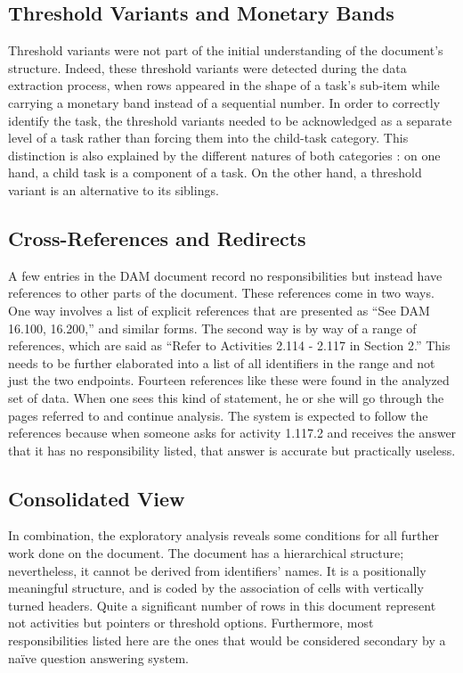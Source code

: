 \subsection{Threshold Variants and Monetary Bands}

Threshold variants were not part of the initial understanding of the document’s structure. Indeed, these threshold variants were detected during the data extraction process, when rows appeared in the shape of a task’s sub-item while carrying a monetary band instead of a sequential number. 
In order to correctly identify the task, the threshold variants needed to be acknowledged as a separate level of a task rather than forcing them into the child-task category. This distinction is also explained by the different natures of both categories : on one hand, a child task is a component of a task. On the other hand, a threshold variant is an alternative to its siblings. 

\subsection{Cross-References and Redirects}

A few entries in the DAM document record no responsibilities but instead have references to other parts of the document. These references come in two ways. One way involves a list of explicit references that are presented as “See DAM 16.100, 16.200,” and similar forms. The second way is by way of a range of references, which are said as “Refer to Activities 2.114 - 2.117 in Section 2.” This needs to be further elaborated into a list of all identifiers in the range and not just the two endpoints.
Fourteen references like these were found in the analyzed set of data. When one sees this kind of statement, he or she will go through the pages referred to and continue analysis. The system is expected to follow the references because when someone asks for activity 1.117.2 and receives the answer that it has no responsibility listed, that answer is accurate but practically useless.

\subsection{Consolidated View}

In combination, the exploratory analysis reveals some conditions for all further work done on the document. The document has a hierarchical structure; nevertheless, it cannot be derived from identifiers’ names. It is a positionally meaningful structure, and is coded by the association of cells with vertically turned headers. Quite a significant number of rows in this document represent not activities but pointers or threshold options. Furthermore, most responsibilities listed here are the ones that would be considered secondary by a naïve question answering system.

